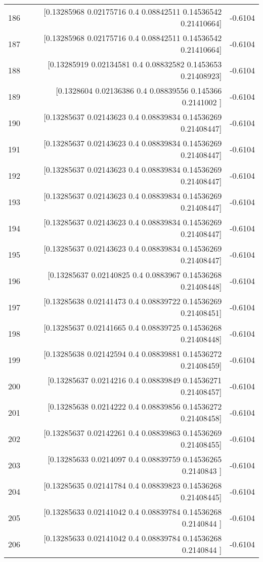 \begin{longtable}{lrr}
186 & [0.13285968 0.02175716 0.4        0.08842511 0.14536542 0.21410664] & -0.6104 \\
187 & [0.13285968 0.02175716 0.4        0.08842511 0.14536542 0.21410664] & -0.6104 \\
188 & [0.13285919 0.02134581 0.4        0.08832582 0.1453653  0.21408923] & -0.6104 \\
189 & [0.1328604  0.02136386 0.4        0.08839556 0.145366   0.2141002 ] & -0.6104 \\
190 & [0.13285637 0.02143623 0.4        0.08839834 0.14536269 0.21408447] & -0.6104 \\
191 & [0.13285637 0.02143623 0.4        0.08839834 0.14536269 0.21408447] & -0.6104 \\
192 & [0.13285637 0.02143623 0.4        0.08839834 0.14536269 0.21408447] & -0.6104 \\
193 & [0.13285637 0.02143623 0.4        0.08839834 0.14536269 0.21408447] & -0.6104 \\
194 & [0.13285637 0.02143623 0.4        0.08839834 0.14536269 0.21408447] & -0.6104 \\
195 & [0.13285637 0.02143623 0.4        0.08839834 0.14536269 0.21408447] & -0.6104 \\
196 & [0.13285637 0.02140825 0.4        0.0883967  0.14536268 0.21408448] & -0.6104 \\
197 & [0.13285638 0.02141473 0.4        0.08839722 0.14536269 0.21408451] & -0.6104 \\
198 & [0.13285637 0.02141665 0.4        0.08839725 0.14536268 0.21408448] & -0.6104 \\
199 & [0.13285638 0.02142594 0.4        0.08839881 0.14536272 0.21408459] & -0.6104 \\
200 & [0.13285637 0.0214216  0.4        0.08839849 0.14536271 0.21408457] & -0.6104 \\
201 & [0.13285638 0.0214222  0.4        0.08839856 0.14536272 0.21408458] & -0.6104 \\
202 & [0.13285637 0.02142261 0.4        0.08839863 0.14536269 0.21408455] & -0.6104 \\
203 & [0.13285633 0.0214097  0.4        0.08839759 0.14536265 0.2140843 ] & -0.6104 \\
204 & [0.13285635 0.02141784 0.4        0.08839823 0.14536268 0.21408445] & -0.6104 \\
205 & [0.13285633 0.02141042 0.4        0.08839784 0.14536268 0.2140844 ] & -0.6104 \\
206 & [0.13285633 0.02141042 0.4        0.08839784 0.14536268 0.2140844 ] & -0.6104 \\

\end{longtable}
